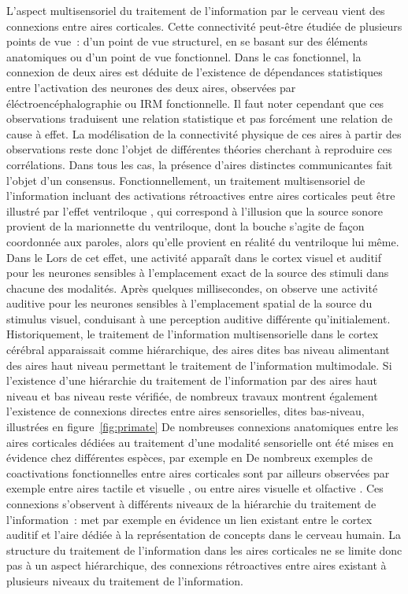 \documentclass[../main]{subfiles}
\begin{document}
L'aspect multisensoriel du traitement de l'information par le cerveau vient des connexions entre aires corticales.
Cette connectivité peut-être étudiée de plusieurs points de vue~: d'un point de vue structurel, en se basant sur des éléments anatomiques ou d'un point de vue fonctionnel.
Dans le cas fonctionnel, la connexion de deux aires est déduite de l'existence de dépendances statistiques entre l'activation des neurones des deux aires, observées par éléctroencéphalographie ou IRM fonctionnelle. Il faut noter cependant que ces observations traduisent une relation statistique et pas forcément une relation de cause à effet. 
La modélisation de la connectivité physique de ces aires à partir des observations reste donc l'objet de différentes théories cherchant à reproduire ces corrélations. 
Dans tous les cas, la présence d'aires distinctes communicantes fait l'objet d'un consensus. 
Fonctionnellement, un traitement multisensoriel de l'information incluant des activations rétroactives entre aires corticales peut être illustré par l'effet ventriloque \cite{Bonath2007NeuralBO}, qui correspond à l'illusion que la source sonore provient de la marionnette du ventriloque, dont la bouche s'agite de façon coordonnée aux paroles, alors qu'elle provient en réalité du ventriloque lui même. Dans le
Lors de cet effet, une activité apparaît dans le cortex visuel et auditif pour les neurones sensibles à l'emplacement exact de la source des stimuli dans chacune des modalités. 
Après quelques millisecondes, on observe une activité auditive pour les neurones sensibles à l'emplacement spatial de la source du stimulus visuel, conduisant à une perception auditive différente qu'initialement.
Historiquement, le traitement de l'information multisensorielle dans le cortex cérébral apparaissait comme hiérarchique, des aires dites bas niveau alimentant des aires haut niveau permettant le traitement de l'information multimodale. 
Si l'existence d'une hiérarchie du traitement de l'information par des aires haut niveau et bas niveau reste vérifiée, de nombreux travaux montrent également l'existence de connexions directes entre aires sensorielles, dites bas-niveau, illustrées en figure~\ref{fig:primate}
De nombreuses connexions anatomiques entre les aires corticales dédiées au traitement d'une modalité sensorielle ont été mises en évidence chez différentes espèces, par exemple en \cite{Calvert2004MultisensoryIM, Cappe2009MultisensoryAP,Foxe2005TheCF,Schroeder2005MultisensoryCT}
De nombreux exemples de coactivations fonctionnelles entre aires corticales sont par ailleurs observées par exemple entre aires tactile et visuelle \cite{Sathian2002FeelingWT}, ou entre aires visuelle et olfactive \cite{Gonzlez2006ReadingCA}.
Ces connexions s'observent à différents niveaux de la hiérarchie du traitement de l'information~: \cite{Kiefer2008TheSO} met par exemple en évidence un lien existant entre le cortex auditif et l'aire dédiée à la représentation de concepts dans le cerveau humain.
La structure du traitement de l'information dans les aires corticales ne se limite donc pas à un aspect hiérarchique, des connexions rétroactives entre aires existant à plusieurs niveaux du traitement de l'information.
\end{document}

